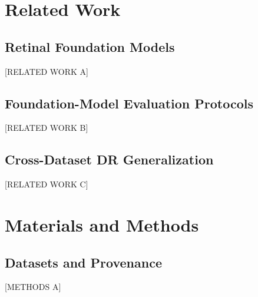 \documentclass[journal]{IEEEtran}
\begin{document}
\section{Related Work}

\subsection{Retinal Foundation Models}
[RELATED WORK A]

\subsection{Foundation-Model Evaluation Protocols}
[RELATED WORK B]

\subsection{Cross-Dataset DR Generalization}
[RELATED WORK C]

\section{Materials and Methods}

\subsection{Datasets and Provenance}
[METHODS A]
\end{document}
